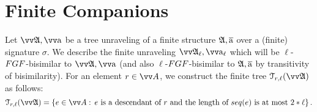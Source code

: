 
\section{Finite Companions}\label{sec:finite}
Let $\unravel{A}, \elemtuptuplea$ be a tree unraveling of a finite structure ${\mathfrak{A}}, \overline{\mathrm{a}}$ over a (finite) signature $\sigma$.
We describe the finite unraveling $\unravel{A}_{\ell}, \elemtuptuplea_{\ell}$ which will be $\ell$-$\FGF$-bisimilar to $\unravel{A}, \elemtuptuplea$ (and also $\ell$-$\FGF$-bisimilar to ${\mathfrak{A}}, \overline{\mathrm{a}}$ by transitivity of bisimilarity).
For an element $r \in \unraveldom{A}$, we construct the finite tree $\mathcal{T}_{r,\ell}(\unravel{A})$ as follows:
\begin{equation*}
  \mathcal{T}_{r,\ell}(\unravel{A}) = \left\{ e \in \unraveldom{A}:\, e\ \text{is a descendant of $r$ and the length of $\seq{e}$ is at most $2 * \ell$} \right\}.
\end{equation*}

